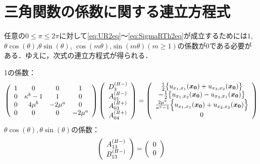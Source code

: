 \section{三角関数の係数に関する連立方程式}

任意の$0\leq\pi\leq2\pi$に対して\eqref{eq:UR2eq}～\eqref{eq:SigmaRTh2eq}が成立するためには$1$,$\theta\cos(\theta)$,$\theta\sin(\theta)$,
$\cos(m\theta)$,$\sin(m\theta)$$(m\geq1)$の係数が0である必要がある．ゆえに，次式の連立方程式が得られる．

1の係数：
\begin{align}
	\left(
	\begin{array}{cccc}
		1& 0 & 0 & 1 \\
		0 & \kappa^b-1 & 1 & 0 \\
		0 & 4\mu^{b} & -2\mu^{a} & 0 \\
		0 & 0 & 0 & -2\mu^{a} \\
	\end{array}
	\right)
	\left(
	\begin{array}{c}
		D_{3}^{(I\hspace{-.15em}I-)} \\
	 	A_{01}^{(I\hspace{-.15em}I-)} \\
		A_{03}^{(I\hspace{-.15em}I+)}\\
	 	A_{04}^{(I\hspace{-.15em}I+)} \\
	\end{array}
	\right)
	=
	\left(
	\begin{array}{c}
		\frac{1}{2}\bigl\{u_{x_{1},x_{1}}(\bm{x_{0}})+u_{x_{2},x_{2}}(\bm{x_{0}})\bigr\} \\
	 	-\frac{1}{2}\bigl\{u_{x_{1},x_{2}}(\bm{x_{0}})-u_{x_{2},x_{1}}(\bm{x_{0}})\bigr\} \\
		\frac{2\mu^a}{\kappa^a-1}\Bigl\{ u_{x_{1},x_{1}}(\bm{x_{0}})+ u_{x_{2},x_{2}}(\bm{x_{0}})\Bigr\} \\
	 	0 \\
	\end{array}
	\right)
\end{align}
$\theta\cos(\theta),\theta\sin(\theta)$の係数：
\begin{align}
	\left(
	\begin{array}{c}
		A_{13}^{(I\hspace{-.15em}I-)} \\
	 	B_{13}^{(I\hspace{-.15em}I-)} \\
	\end{array}
	\right)
	=
	\left(
	\begin{array}{c}
		0 \\
	 	0 \\
	\end{array}
	\right)
\end{align}
